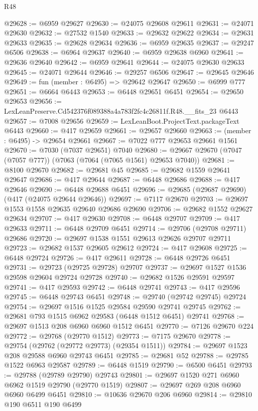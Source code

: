 \begin{lexlean}{R48}
\begin{coremodule}
@29628 := @6959 @29627
@29630 := @24075 @29608 @29611
@29631 := @24071 @29630
@29632 := @27532 @1540
@29633 := @29632 @29622
@29634 := @29631 @29633
@29635 := @29628 @29634
@29636 := @6959 @29635
@29637 := @29247 @6506
@29638 := @6964 @29637
@29640 := @6959 @29638 @6960
@29641 := @29636 @29640
@29642 := @6959 @29641
@29644 := @24075 @29630 @29633
@29645 := @24071 @29644
@29646 := @29257 @6506
@29647 := @29645 @29646
@29649 := fun (member : @6495) => @29642 @29647
@29650 := @6999 @777
@29651 := @6664 @6443
@29653 := @6448 @29651 @6451
@29654 := @29650 @29653
@29656 := LexLeanPreserve.Cd542376f089388a4a783f2fc4c26811f.R48.__fits_23 @6443
@29657 := @7008 @29656
@29659 := LexLeanBoot.ProjectText.packageText @6443
@29660 := @417 @29659
@29661 := @29657 @29660
@29663 := (member : @6495) -> @29654 @29661
@29667 := @7022 @777 @29653 @29661 @1561
@29670 := @7030 (@7037 @29651) @7040
@29680 := @29667 @29670 (@7047 (@7057 @777)) (@7063 (@7064 (@7065 @1561) @29653 @7040))
@29681 := @8100 @29670
@29682 := @29681 @45
@29685 := @29682 @1559 @29641 @29647
@29686 := @417 @29644
@29687 := @6448 @29686
@29688 := @417 @29646
@29690 := @6448 @29688 @6451
@29696 := @29685 (@29687 @29690) (@417 (@24075 @29644 @29646))
@29697 := @7117 @29670
@29703 := @29697 @1553 @1558 @29635 @29640 @29686 @29690
@29706 := @29682 @1552 @29627 @29634
@29707 := @417 @29630
@29708 := @6448 @29707
@29709 := @417 @29633
@29711 := @6448 @29709 @6451
@29714 := @29706 (@29708 @29711) @29686
@29720 := @29697 @1538 @1551 @29613 @29626 @29707 @29711
@29723 := @29682 @1537 @29605 @29612
@29724 := @417 @29608
@29725 := @6448 @29724
@29726 := @417 @29611
@29728 := @6448 @29726 @6451
@29731 := @29723 (@29725 @29728) @29707
@29737 := @29697 @1527 @1536 @29598 @29604 @29724 @29728
@29740 := @29682 @1526 @29591 @29597
@29741 := @417 @29593
@29742 := @6448 @29741
@29743 := @417 @29596
@29745 := @6448 @29743 @6451
@29748 := @29740 (@29742 @29745) @29724
@29754 := @29697 @1516 @1525 @29584 @29590 @29741 @29745
@29762 := @29681 @793 @1515 @6962 @29583 (@6448 @1512 @6451) @29741
@29768 := @29697 @1513 @208 @6960 @6960 @1512 @6451
@29770 := @7126 @29670 @224
@29772 := @29768 (@29770 @1512)
@29773 := @7175 @29670
@29778 := @29754 (@29762 (@29772 @29773) (@29354 @1511))
@29784 := @29697 @1523 @208 @29588 @6960 @29743 @6451
@29785 := @29681 @52
@29788 := @29785 @1522 @6963 @29587
@29789 := @6448 @1519
@29790 := @6500 @6451
@29793 := @29788 (@29789 @29790) @29743
@29801 := @29697 @1520 @271 @6960 @6962 @1519 @29790 (@29770 @1519)
@29807 := @29697 @269 @208 @6960 @6960 @6499 @6451
@29810 := @10636 @29670 @206 @6960
@29814 := @29810 @190 @6511 @190 @6499

\end{coremodule}
\end{lexlean}
